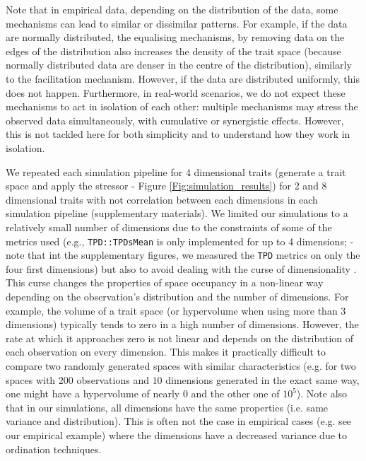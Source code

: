 \documentclass[12pt,letterpaper]{article}
\begin{document}
Note that in empirical data, depending on the distribution of the data, some mechanisms can lead to similar or dissimilar patterns.
For example, if the data are normally distributed, the equalising mechanisms, by removing data on the edges of the distribution also increases the density of the trait space (because normally distributed data are denser in the centre of the distribution), similarly to the facilitation mechanism.
However, if the data are distributed uniformly, this does not happen.
Furthermore, in real-world scenarios, we do not expect these mechanisms to act in isolation of each other: multiple mechanisms may stress the observed data simultaneously, with cumulative or synergistic effects.
However, this is not tackled here for both simplicity and to understand how they work in isolation. 

We repeated each simulation pipeline for 4 dimensional traits (generate a trait space and apply the stressor - Figure \ref{Fig:simulation_results}) for 2 and 8 dimensional traits with not correlation between each dimensions in each simulation pipeline (supplementary materials).
We limited our simulations to a relatively small number of dimensions due to the constraints of some of the metrics used (e.g., \texttt{TPD::TPDsMean} is only implemented for up to 4 dimensions; \citealt{carmona2019trait} - note that int the supplementary figures, we measured the \texttt{TPD} metrics on only the four first dimensions) but also to avoid dealing with the curse of dimensionality \citep{bellman1957dynamic}.
This curse changes the properties of space occupancy in a non-linear way depending on the observation's distribution and the number of dimensions.
For example, the volume of a trait space (or hypervolume when using more than 3 dimensions) typically tends to zero in a high number of dimensions.
However, the rate at which it approaches zero is not linear and depends on the distribution of each observation on every dimension.
This makes it practically difficult to compare two randomly generated spaces with similar characteristics (e.g. for two spaces with $200$ observations and $10$ dimensions generated in the exact same way, one might have a hypervolume of nearly $0$ and the other one of $10^5$).
Note also that in our simulations, all dimensions have the same properties (i.e. same variance and distribution).
This is often not the case in empirical cases (e.g. see our empirical example) where the dimensions have a decreased variance due to ordination techniques.
 
\end{document}

